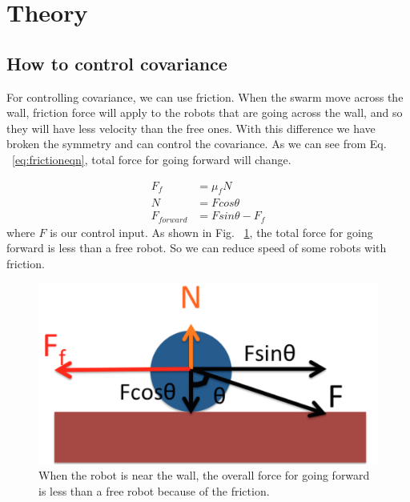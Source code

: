 \section{Theory}
\label{sec:theory}




\subsection{How to control covariance}

For controlling covariance, we can use friction. When the swarm move across the wall, friction force will apply to the robots that are going across the wall, and so they will have less velocity than the free ones. With this difference we have broken the symmetry and can control the covariance. As we can see from Eq. ~\ref{eq:frictioneqn}, total force for going forward will change. 

\begin{align}
\label{eq:frictioneqn}
F_f &= \mu_f N \nonumber\\
N &= F cos\theta \nonumber\\
F_{forward} &= F sin\theta - F_f
\end{align}
where $F$ is our control input. As shown in Fig. ~\ref{fig:friction}, the total force for going forward is less than a free robot. So we can reduce speed of some robots with friction.

\begin{figure}[h]
\begin{center}
\includegraphics[width=\columnwidth]{friction.png}
\caption{When the robot is near the wall, the overall force for going forward is less than a free robot because of the friction.}
\label{fig:friction}
\end{center}
\end{figure} 


